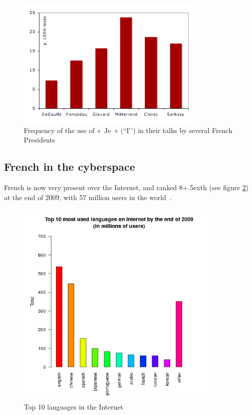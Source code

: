\begin{multicols}{2}
\begin{figure}[ht]
\begin{center}
 \includegraphics[height=2.5in]{_media/french/french_pix1_freq_je.png} 
  \caption{Frequency of the use of «~Je~» (``I{\mbox '}{\mbox '}) in their talks by several French Presidents}
  \label{fig:je_stats_en}
\end{center}
\end{figure}

\subsection{French in the cyberspace}

French is now very present over the Internet, and ranked
8\raise+.5ex\hbox{th} (see figure \ref{fig:internettop10_en}) at the end
of 2009, with 57 million users in the world~\cite{internettop10}.

\begin{figure}[ht]
\begin{center}
 \includegraphics[height=4.0in]{_media/french/french_pix2_top_10_Internet_languages_2010_english.png}
  \caption{Top 10 languages in the Internet~\cite{internettop10}}
  \label{fig:internettop10_en}
\end{center}
\end{figure}


\end{multicols}
